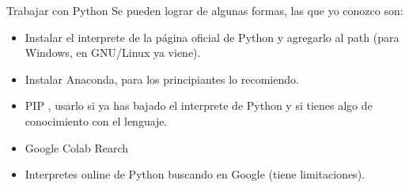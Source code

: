 \begin{frame}{Trabajar con Python}
\justifying
Se pueden lograr de algunas formas, las que yo conozco son:

\begin{itemize}
\item Instalar el interprete de la página oficial de Python y agregarlo al path (para Windows, en GNU/Linux ya viene).
\item Instalar Anaconda, para los principiantes lo recomiendo.
\item PIP , usarlo si ya has bajado el interprete de Python y si tienes algo de conocimiento con el lenguaje.
\item Google Colab Rearch
\item Interpretes online de Python buscando en Google (tiene limitaciones).
\end{itemize}
\end{frame}

